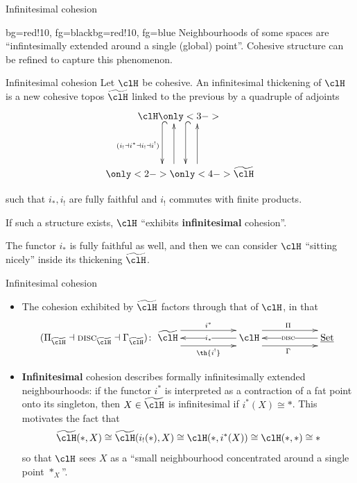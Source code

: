 \documentclass[presentation]{beamer}
\begin{document}
%
%
%
%
%
%
%
\begin{frame}{Infinitesimal cohesion}
  \begin{variableblock}{}{bg=red!10, fg=black}{bg=red!10, fg=blue}
    Neighbourhoods of some spaces are ``infintesimally extended around a single (global) point''. Cohesive structure can be refined to capture this phenomenon.
  \end{variableblock}
\end{frame}
%
%
%
%
%
%
%
\begin{frame}{Infinitesimal cohesion}
  Let $\clH$ be cohesive. An \alert{infinitesimal thickening} of $\clH$ is a new cohesive topos $\thH$ linked to the previous by a quadruple of adjoints
  \[
  \xymatrix@R=1.5cm{
  \clH
  \ar@{^{(}->}@<-18pt>[d]_{(i_! \dashv i^* \dashv i_! \dashv i^!)}
  \only<3->{\ar@{^{(}->}@<6pt>[d]}
  \\
  \ar@[white]@<-18pt>[u]
  \only<2->{\ar@<6pt>[u]}
  \only<4->{\ar@<-18pt>[u]}
  \thH
  }
  \]
  
  \vspace*{\fill}
  such that $i_*, i_!$ are fully faithful and $i_!$ commutes with finite products.
  
  If such a structure exists, $\clH$ ``exhibits \textbf{infinitesimal} cohesion''.
  \begin{myblock}{}
    The functor $i_*$ is fully faithful as well, and then we can consider $\clH$ ``sitting nicely'' inside its thickening $\thH$.
  \end{myblock}
\end{frame}
%
%
%
%
%
%
%
\begin{frame}{Infinitesimal cohesion}
  \begin{itemize}
    \item<+-> The cohesion exhibited by $\thH$ \alert{factors through} that of $\clH$, in that
    \[
    (\Pi_{\thH} \dashv \disc_{\thH} \dashv \Gamma_{\thH})
    \colon
    \xymatrix@C=2cm{
    \thH \ar@<-8pt>[r]_{\th{i^!}} \ar@{<-}[r]|{i_*} \ar@<8pt>[r]^{i^*} &
    \clH \ar@<-8pt>[r]_\Gamma \ar@{<-}[r]|{\disc} \ar@<8pt>[r]^\Pi &
    \Set
    }
    \]
    \item<+-> \textbf{Infinitesimal} cohesion describes formally infinitesimally extended neighbourhoods: if the functor $i^*$ is interpreted as a \alert{contraction} of a fat point onto its singleton, then $X\in \thH$ is infinitesimal if $i^*(X)\cong *$. \onslide<+->This motivates the fact that
    \[
    \thH(*,X)\cong \thH(i_!(*),X)\cong \clH(*,i^*(X))\cong \clH(*,*)\cong *
    \]
    so that $\clH$ sees $X$ as a  ``small neighbourhood concentrated around a single point $*_X$''.
  \end{itemize}
\end{frame}
\end{document}
